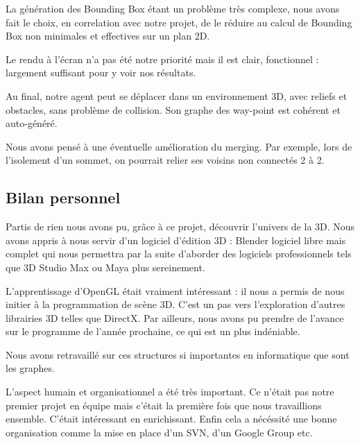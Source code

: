 \documentclass[a4paper,12pt]{report}
\begin{document}
La génération des Bounding Box étant un problème très complexe, nous avons fait le choix, en correlation avec notre projet, de le réduire au calcul de Bounding Box non minimales et effectives sur un plan 2D.

Le rendu à l'écran n'a pas été notre priorité mais il est clair, fonctionnel : largement suffisant pour y voir nos résultats.

Au final, notre agent peut se déplacer dans un environnement 3D, avec reliefs et obstacles, sans problème de collision. Son graphe des way-point est cohérent et auto-généré.

Nous avons pensé à une éventuelle amélioration du merging. Par exemple, lors de l'isolement d'un sommet, on pourrait relier ses voisins non connectés 2 à 2.

\subsection*{Bilan personnel}
Partis de rien nous avons pu, grâce à ce projet, découvrir l'univers de la 3D. Nous avons appris à nous servir d'un logiciel d'édition 3D : Blender logiciel libre mais complet qui nous permettra par la suite d'aborder des logiciels professionnels tels que 3D Studio Max ou Maya plus sereinement. 

L'apprentissage d'OpenGL était vraiment intéressant : il nous a permis de nous initier à la programmation de scène 3D. C'est un pas vers l'exploration d'autres librairies 3D telles que DirectX. Par ailleurs, nous avons pu prendre de l'avance sur le programme de l'année prochaine, ce qui est un plus indéniable.

Nous avons retravaillé sur ces structures si importantes en informatique que sont les graphes.

L'aspect humain et organisationnel a été très important. Ce n'était pas notre premier projet en équipe mais c'était la première fois que nous travaillions ensemble. C'était intéressant en enrichissant. Enfin cela a nécéssité une bonne organisation comme la mise en place d'un SVN, d'un Google Group etc.
\end{document}
